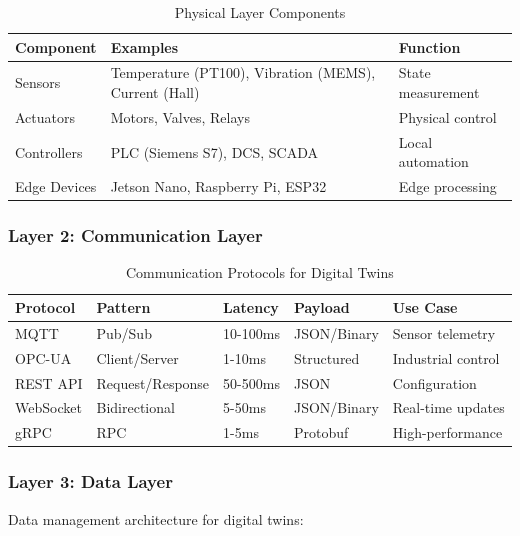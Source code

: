 \documentclass[12pt,a4paper]{article}
\begin{document}
\begin{table}[H]
\centering
\caption{Physical Layer Components}
\begin{tabular}{lll}
\toprule
\textbf{Component} & \textbf{Examples} & \textbf{Function} \\
\midrule
Sensors & Temperature (PT100), Vibration (MEMS), Current (Hall) & State measurement \\
Actuators & Motors, Valves, Relays & Physical control \\
Controllers & PLC (Siemens S7), DCS, SCADA & Local automation \\
Edge Devices & Jetson Nano, Raspberry Pi, ESP32 & Edge processing \\
\bottomrule
\end{tabular}
\end{table}

\subsubsection{Layer 2: Communication Layer}

\begin{table}[H]
\centering
\caption{Communication Protocols for Digital Twins}
\begin{tabular}{lllll}
\toprule
\textbf{Protocol} & \textbf{Pattern} & \textbf{Latency} & \textbf{Payload} & \textbf{Use Case} \\
\midrule
MQTT & Pub/Sub & 10-100ms & JSON/Binary & Sensor telemetry \\
OPC-UA & Client/Server & 1-10ms & Structured & Industrial control \\
REST API & Request/Response & 50-500ms & JSON & Configuration \\
WebSocket & Bidirectional & 5-50ms & JSON/Binary & Real-time updates \\
gRPC & RPC & 1-5ms & Protobuf & High-performance \\
\bottomrule
\end{tabular}
\end{table}

\subsubsection{Layer 3: Data Layer}

Data management architecture for digital twins:
\end{document}
